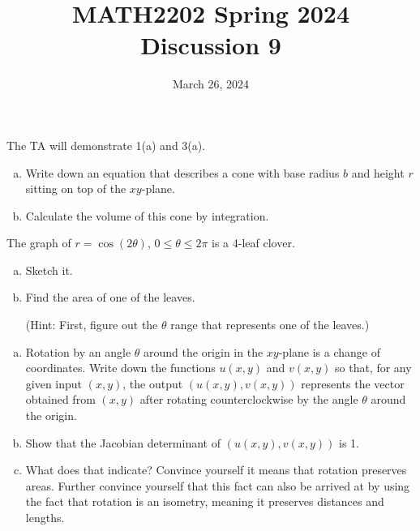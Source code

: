 \documentclass[11pt,oneside]{amsart}
\title{MATH2202 Spring 2024\\
Discussion 9}
\date{March 26, 2024}
\theoremstyle{definition}
\begin{document}
  \maketitle

  The TA will demonstrate 1(a) and 3(a).

  \begin{problem}\leavevmode
    \begin{enumerate}[(a)]
      \item Write down an equation that describes a cone with base radius $b$ and height $r$ sitting on top of the $xy$-plane.
      \item Calculate the volume of this cone by integration.
    \end{enumerate}
  \end{problem}

  \begin{problem}
    The graph of $r=\cos(2\theta)$, $0\leq\theta\leq 2\pi$ is a 4-leaf clover.
    \begin{enumerate}[(a)]
      \item Sketch it.
      \item Find the area of one of the leaves.

      (Hint: First, figure out the $\theta$ range that represents one of the leaves.)
    \end{enumerate}
  \end{problem}

  \begin{problem}\leavevmode
    \begin{enumerate}[(a)]
      \item Rotation by an angle $\theta$ around the origin in the $xy$-plane is a change of coordinates. Write down the functions $u(x,y)$ and $v(x,y)$ so that, for any given input $(x,y)$, the output $(u(x,y),v(x,y))$ represents the vector obtained from $(x,y)$ after rotating counterclockwise by the angle $\theta$ around the origin.
      \item Show that the Jacobian determinant of $(u(x,y),v(x,y))$ is 1.
      \item What does that indicate? Convince yourself it means that rotation preserves areas. Further convince yourself that this fact can also be arrived at by using the fact that rotation is an isometry, meaning it preserves distances and lengths.
    \end{enumerate}
  \end{problem}
\end{document}
